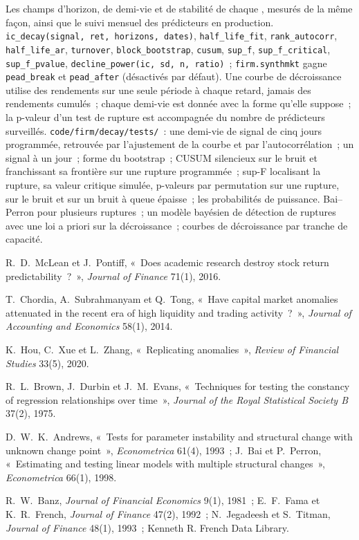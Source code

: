 \begin{build}
 Les champs d'horizon, de demi-vie et de stabilité de chaque , mesurés de la même façon, ainsi que le suivi mensuel des
prédicteurs en production.
 \texttt{ic\_decay(signal, ret, horizons, dates)}, \texttt{half\_life\_fit}, \texttt{rank\_autocorr}, \texttt{half\_life\_ar},
\texttt{turnover}, \texttt{block\_bootstrap}, \texttt{cusum}, \texttt{sup\_f}, \texttt{sup\_f\_critical}, \texttt{sup\_f\_pvalue},
\texttt{decline\_power(ic, sd, n, ratio)}~; \texttt{firm.synthmkt} gagne \texttt{pead\_break} et \texttt{pead\_after} (désactivés par défaut).
 Une courbe de décroissance utilise des rendements sur une seule période à chaque retard, jamais des rendements cumulés~; chaque demi-vie est donnée avec la forme qu'elle suppose~;
la p-valeur d'un test de rupture est accompagnée du nombre de prédicteurs surveillés.
 \texttt{code/firm/decay/tests/}~: une demi-vie de signal de cinq jours programmée, retrouvée par l'ajustement de la courbe et par l'autocorrélation~; un
signal à un jour~; forme du bootstrap~; CUSUM silencieux sur le bruit et franchissant sa frontière sur une rupture programmée~; sup-F localisant la rupture, sa valeur critique simulée,
p-valeurs par permutation sur une rupture, sur le bruit et sur un bruit à queue épaisse~; les probabilités de puissance.
 Bai--Perron pour plusieurs ruptures~; un modèle bayésien de détection de ruptures avec une loi a priori sur la décroissance~; courbes de décroissance par tranche de capacité.
\end{build}

\begin{omsources}
\item R.~D.~McLean et J.~Pontiff, «~Does academic research destroy stock return predictability~?~», \emph{Journal of Finance} 71(1), 2016.
\item T.~Chordia, A.~Subrahmanyam et Q.~Tong, «~Have capital market anomalies attenuated in the recent era of high liquidity and trading
activity~?~», \emph{Journal of Accounting and Economics} 58(1), 2014.
\item K.~Hou, C.~Xue et L.~Zhang, «~Replicating anomalies~», \emph{Review of Financial Studies} 33(5), 2020.
\item R.~L.~Brown, J.~Durbin et J.~M.~Evans, «~Techniques for testing the constancy of regression relationships over time~», \emph{Journal of the
Royal Statistical Society B} 37(2), 1975.
\item D.~W.~K.~Andrews, «~Tests for parameter instability and structural change with unknown change point~», \emph{Econometrica} 61(4), 1993~;
J.~Bai et P.~Perron, «~Estimating and testing linear models with multiple structural changes~», \emph{Econometrica} 66(1), 1998.
\item R.~W.~Banz, \emph{Journal of Financial Economics} 9(1), 1981~; E.~F.~Fama et K.~R.~French, \emph{Journal of Finance} 47(2), 1992~;
N.~Jegadeesh et S.~Titman, \emph{Journal of Finance} 48(1), 1993~; Kenneth R. French Data Library.
\end{omsources}

